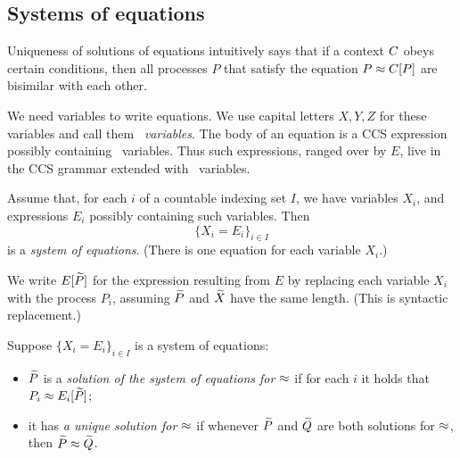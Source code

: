 \subsection{Systems of  equations}
\label{ss:SysEq}

             
Uniqueness of  solutions of equations \cite{Mil89} intuitively says that if  a context $C$ obeys
certain  conditions, 
then all processes $P$  that satisfy the equation $ P \approx C [P]$ are
bisimilar with each other.

We need variables to write equations. We  use
 capital
letters  $X,Y,Z$
 for  these variables and call them \emph{\behav\  variables}.
 The body of an equation is a CCS expression
possibly containing \behav\  variables. Thus such expressions, ranged
over by $E$, live in the CCS
grammar extended with \behav\  variables.

  
\begin{definition}
Assume that, for each $i$ of 
 a countable indexing set $I$, we have variables $X_i$, and expressions
$E_i$ possibly containing  such variables. 
Then 
$$\{  X_i = E_i\}_{i\in I}$$
is 
  a \emph{system of equations}. (There is one equation for each variable $X_i$.)
\end{definition}

We write $E[\widetilde P]$ for the expression resulting from $E$ by
replacing each variable $X_i$   with the process $P_i$, assuming
$\widetilde P$ and $\widetilde X$ have the same length. (This is syntactic
replacement.) 
\begin{definition}
Suppose  $\{  X_i = E_i\}_{i\in I}$ is a system of equations: 
\begin{itemize}
\item
 $\widetilde P$ is a \emph{solution of the 
system of equations  for $\approx$} 
if for each $i$ it holds
that $P_i \approx E_i [\widetilde P]$;

\item it %
 has \emph{a unique solution for $\approx$}  if whenever 
 $\widetilde P$ and $\widetilde Q$ are both solutions for $\approx$, then $\widetilde P \approx
 \widetilde Q$. 
\end{itemize} 
 \end{definition} 





